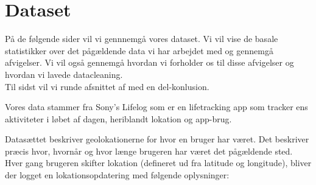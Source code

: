 \chapter{Dataset}
På de følgende sider vil vi gennnemgå vores dataset. Vi vil vise de basale statistikker over det pågældende data vi har arbejdet med og gennemgå afvigelser. Vi vil også gennemgå hvordan vi forholder os til disse afvigelser og hvordan vi lavede datacleaning. \\
Til sidst vil vi runde afsnittet af med en del-konlusion. 

Vores data stammer fra Sony's Lifelog\cite{sonyLifeLog} som er en lifetracking app som tracker ens aktiviteter i løbet af dagen, heriblandt lokation og app-brug.

Datasættet beskriver geolokationerne for hvor en bruger har været. Det beskriver præcis hvor, hvornår og hvor længe brugeren har været det pågældende sted. Hver gang brugeren skifter lokation (defineret ud fra latitude og longitude), bliver der logget en lokationsopdatering med følgende oplysninger:
